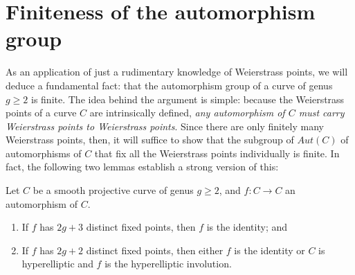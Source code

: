 \section{Finiteness of the automorphism group}

As an application of just a rudimentary knowledge of Weierstrass points, we will deduce a fundamental fact: that the automorphism group of a curve of genus $g\geq 2$ is finite. The idea behind the argument is simple: because the Weierstrass points of a curve $C$ are intrinsically defined, \emph{any automorphism of $C$ must carry Weierstrass points to Weierstrass points}. Since there are only finitely many Weierstrass points, then, it will suffice to show that the subgroup of $Aut(C)$ of automorphisms of $C$ that fix all the Weierstrass points individually is finite. In fact, the following two lemmas establish a strong version of this:

\begin{lemma}
Let $C$ be a smooth projective curve of genus $g \geq 2$, and $f: C \to C$ an automorphism of $C$.
\begin{enumerate}
\item If $f$ has $2g+3$ distinct fixed points, then $f$ is the identity; and
\item If $f$ has $2g+2$ distinct fixed points, then either $f$ is the identity or $C$ is hyperelliptic and $f$ is the hyperelliptic involution.
\end{enumerate}
\end{lemma}

